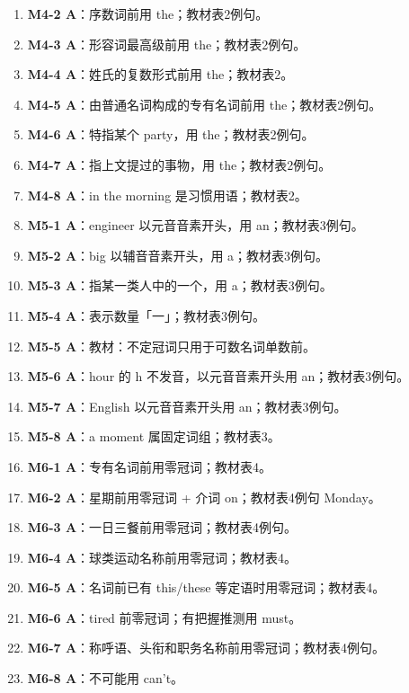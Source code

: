 \documentclass[11pt,a4paper]{ctexart}
\begin{document}
\begin{enumerate}[leftmargin=1.6em,itemsep=2pt]
\item \textbf{M4-2 A}：序数词前用 the；教材表2例句。
\item \textbf{M4-3 A}：形容词最高级前用 the；教材表2例句。
\item \textbf{M4-4 A}：姓氏的复数形式前用 the；教材表2。
\item \textbf{M4-5 A}：由普通名词构成的专有名词前用 the；教材表2例句。
\item \textbf{M4-6 A}：特指某个 party，用 the；教材表2例句。
\item \textbf{M4-7 A}：指上文提过的事物，用 the；教材表2例句。
\item \textbf{M4-8 A}：in the morning 是习惯用语；教材表2。
\item \textbf{M5-1 A}：engineer 以元音音素开头，用 an；教材表3例句。
\item \textbf{M5-2 A}：big 以辅音音素开头，用 a；教材表3例句。
\item \textbf{M5-3 A}：指某一类人中的一个，用 a；教材表3例句。
\item \textbf{M5-4 A}：表示数量「一」；教材表3例句。
\item \textbf{M5-5 A}：教材：不定冠词只用于可数名词单数前。
\item \textbf{M5-6 A}：hour 的 h 不发音，以元音音素开头用 an；教材表3例句。
\item \textbf{M5-7 A}：English 以元音音素开头用 an；教材表3例句。
\item \textbf{M5-8 A}：a moment 属固定词组；教材表3。
\item \textbf{M6-1 A}：专有名词前用零冠词；教材表4。
\item \textbf{M6-2 A}：星期前用零冠词 + 介词 on；教材表4例句 Monday。
\item \textbf{M6-3 A}：一日三餐前用零冠词；教材表4例句。
\item \textbf{M6-4 A}：球类运动名称前用零冠词；教材表4。
\item \textbf{M6-5 A}：名词前已有 this/these 等定语时用零冠词；教材表4。
\item \textbf{M6-6 A}：tired 前零冠词；有把握推测用 must。
\item \textbf{M6-7 A}：称呼语、头衔和职务名称前用零冠词；教材表4例句。
\item \textbf{M6-8 A}：不可能用 can’t。
\end{enumerate}
\end{document}
